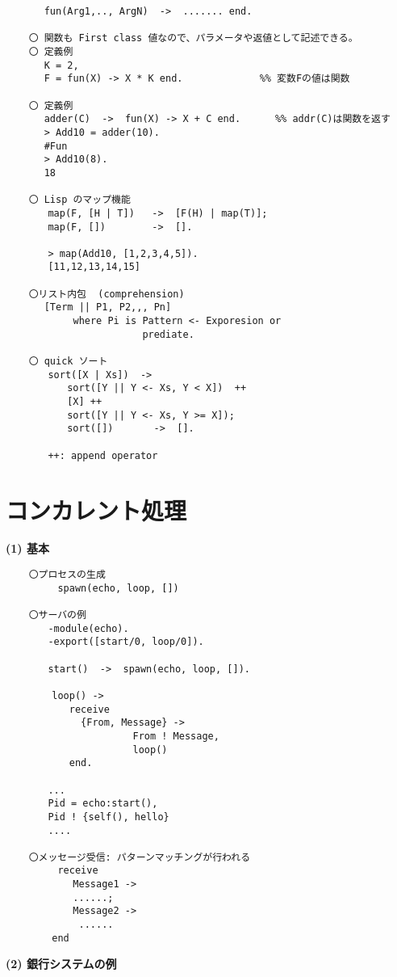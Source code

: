\begin{verbatim}
    　 fun(Arg1,.., ArgN)  ->  ....... end.
    
    〇 関数も First class 値なので、パラメータや返値として記述できる。
    〇 定義例
    　 K = 2,
    　 F = fun(X) -> X * K end.　　　　　　　　%% 変数Fの値は関数

    〇 定義例
    　 adder(C)  ->  fun(X) -> X + C end.　　　 %% addr(C)は関数を返す
    　 > Add10 = adder(10).
    　 #Fun
    　 > Add10(8).
    　 18
    
    〇 Lisp のマップ機能
    　　map(F, [H | T])   ->  [F(H) | map(T)];
    　　map(F, [])        ->  [].
    　　
    　　> map(Add10, [1,2,3,4,5]).
    　　[11,12,13,14,15]
    
    〇リスト内包  (comprehension)
    　 [Term || P1, P2,,, Pn]
    　      where Pi is Pattern <- Exporesion or
    　                  prediate.
    
    〇 quick ソート
    　　sort([X | Xs])  ->
    　　　　sort([Y || Y <- Xs, Y < X])  ++
    　　　　[X] ++
    　　　　sort([Y || Y <- Xs, Y >= X]);
    　　　　sort([])       ->  [].
    　   
    　　++: append operator
\end{verbatim}

    
\section{コンカレント処理}

{\bf (1) 基本}

\begin{verbatim}
    〇プロセスの生成
         spawn(echo, loop, [])
    
    〇サーバの例
    　　-module(echo).
    　　-export([start/0, loop/0]).
    　　
    　　start()  ->  spawn(echo, loop, []).
    
        loop() ->
           receive
             {From, Message} ->
                      From ! Message,
                      loop()
           end.
    
    　　...
    　　Pid = echo:start(),
    　　Pid ! {self(), hello}
    　　....
    
    〇メッセージ受信: パターンマッチングが行われる
         receive
    　　　　 Message1 -> 
    　　　　 ......;
    　　　　 Message2 ->
    　　　　  ......
        end
\end{verbatim}



{\bf (2) 銀行システムの例}

